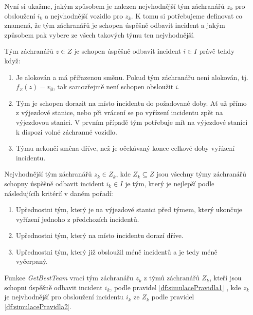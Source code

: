 Nyní si ukažme, jakým způsobem je nalezen nejvhodnější tým záchranářů $z_k$ pro obsloužení $i_k$ a nejvhodnější vozidlo pro $z_k$.
K tomu si potřebujeme definovat co znamená, že tým záchranářů je schopen úspěšně odbavit incident a jakým způsobem pak vybere ze všech takových týmu ten nejvhodnější.

\begin{definice}\label{df:simulacePravidla1}
  Tým záchranářů $z \in Z$ je schopen úspěšně odbavit incident $i \in I$ právě tehdy když:

  \begin{enumerate}
    \item
      Je alokován a má přiřazenou směnu. Pokud tým záchranářu není alokován, tj. $f_Z(z) = v_{\emptyset}$, tak samozřejmě není schopen obsloužit $i$.

    \item
      Tým je schopen dorazit na místo incidentu do požadované doby.
      Ať už přímo z výjezdové stanice, nebo při vrácení se po vyřízení incidentu zpět na výjezdovou stanici. 
      V prvním případě tým potřebuje mít na výjezdové stanici k dispozi volné záchranné vozidlo.

    \item
      Týmu nekončí směna dříve, než je očekávaný konec celkové doby vyřízení incidentu.
  \end{enumerate}
\end{definice}

\begin{definice}\label{df:simulacePravidla2}
  Nejvhodnější tým záchranářů $z_k \in Z_k$, kde $Z_k \subseteq Z$ jsou všechny týmy záchranářů schopny úspěšně odbavit incident $i_k \in I$ je tým,
  který je nejlepší podle následujícíh kritérií v daném pořadí:

  \begin{enumerate}
    \item Upřednostni tým, který je na výjezdové stanici před týmem, který ukončuje vyřízení jednoho z předchozích incidentů. 
    \item Upřednostni tým, který na místo incidentu dorazí dříve. 
    \item Upřednostni tým, který již obsloužil méně incidentů a je tedy méně vyčerpaný.
  \end{enumerate}
\end{definice}

\begin{definice}[GetBestTeam]\label{df:getBestTeam}
Funkce \textit{GetBestTeam} vrací tým záchranářu $z_k$ z týmů záchranářů $Z_k$, kteří jsou schopni úspěšně odbavit incident $i_k$, podle pravidel \ref{df:simulacePravidla1}
, kde $z_k$ je nejvhodnější pro obsloužení incidentu $i_k$ ze $Z_k$ podle pravidel \ref{df:simulacePravidla2}. 
\end{definice}

